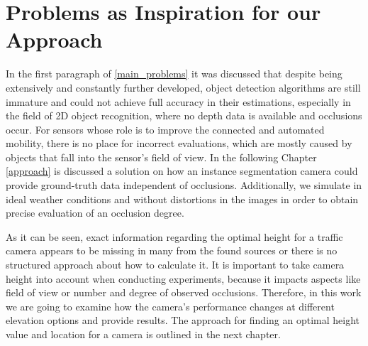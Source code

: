 \section{Problems as Inspiration for our Approach}
In the first paragraph of \ref{main_problems} it was discussed that despite being extensively and constantly further developed, object detection algorithms are still immature and could not achieve full accuracy in their estimations, especially in the field of 2D object recognition, where no depth data is available and occlusions occur. For sensors whose role is to improve the connected and automated mobility, there is no place for incorrect evaluations, which are mostly caused by objects that fall into the sensor's field of view. In the following Chapter \ref{approach} is discussed a solution on how an instance segmentation camera could provide ground-truth data independent of occlusions. Additionally, we simulate in ideal weather conditions and without distortions in the images in order to obtain precise evaluation of an occlusion degree.

As it can be seen, exact information regarding the optimal height for a traffic camera appears to be missing in many from the found sources or there is no structured approach about how to calculate it. It is important to take camera height into account when conducting experiments, because it impacts aspects like field of view or number and degree of observed occlusions. Therefore, in this work we are going to examine how the camera's performance changes at different elevation options and provide results. The approach for finding an optimal height value and location for a camera is outlined in the next chapter.
